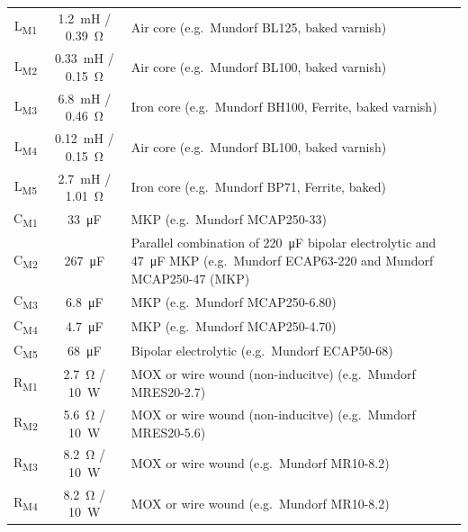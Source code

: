 \documentclass[12pt,a4paper]{article}
\providecommand{\inductor}[1]{L\textsubscript{#1}}
\providecommand{\capacitor}[1]{C\textsubscript{#1}}
\providecommand{\resistor}[1]{R\textsubscript{#1}}
\begin{document}
\begin{table}[tb]
\begin{tabular}{ccp{}}
\inductor{M1}	& \SI{1.2}{mH} / \SI{0.39}{\ohm}	& Air core (e.g.~Mundorf BL125, baked varnish)\\
\inductor{M2}	& \SI{0.33}{mH} / \SI{0.15}{\ohm}	& Air core (e.g.~Mundorf BL100, baked varnish)\\
\inductor{M3}	& \SI{6.8}{mH} / \SI{0.46}{\ohm}	& Iron core (e.g.~Mundorf BH100, Ferrite, baked varnish)\\
\inductor{M4}	& \SI{0.12}{mH} / \SI{0.15}{\ohm}	& Air core (e.g.~Mundorf BL100, baked varnish)\\
\inductor{M5}	& \SI{2.7}{mH} / \SI{1.01}{\ohm}	& Iron core (e.g.~Mundorf BP71, Ferrite, baked)\\
\capacitor{M1}	& \SI{33}{\micro F}			& MKP (e.g.~Mundorf MCAP250-33)\\
\capacitor{M2}	& \SI{267}{\micro F}			& Parallel combination of \SI{220}{\micro F} bipolar electrolytic and \SI{47}{\micro F} MKP (e.g.~Mundorf ECAP63-220 and Mundorf MCAP250-47 (MKP)\\
\capacitor{M3}	& \SI{6.8}{\micro F}			& MKP (e.g.~Mundorf MCAP250-6.80)\\
\capacitor{M4}	& \SI{4.7}{\micro F}			& MKP (e.g.~Mundorf MCAP250-4.70)\\
\capacitor{M5}	& \SI{68}{\micro F}			& Bipolar electrolytic (e.g.~Mundorf ECAP50-68)\\
\resistor{M1}	& \SI{2.7}{\ohm} / \SI{10}{W}		& MOX or wire wound (non-inducitve) (e.g.~Mundorf MRES20-2.7)\\
\resistor{M2}	& \SI{5.6}{\ohm} / \SI{10}{W}		& MOX or wire wound (non-inducitve) (e.g.~Mundorf MRES20-5.6)\\
\resistor{M3}	& \SI{8.2}{\ohm} / \SI{10}{W}		& MOX or wire wound (e.g.~Mundorf MR10-8.2)\\
\resistor{M4}	& \SI{8.2}{\ohm} / \SI{10}{W}		& MOX or wire wound (e.g.~Mundorf MR10-8.2)\\

\midrule


\end{tabular}
\end{table}
\end{document}
